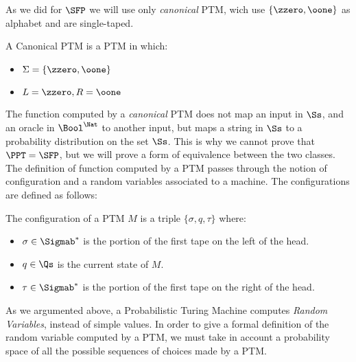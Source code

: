 As we did for $\SFP$ we will use only \emph{canonical} PTM,
wich use $\{\zzero, \oone\}$ as alphabet and are single-taped.
%

\begin{defn}
  A Canonical PTM is a PTM in which:
  \begin{itemize}
    \item $\Sigma =\{\zzero, \oone\}$
    \item $L = \zzero, R = \oone$
  \end{itemize}
\end{defn}

The function computed by a \emph{canonical} PTM does not map an input in $\Ss$,
and an oracle in $\Bool^\Nat$ to another input,
but maps a string in $\Ss$ to a probability distribution on the set $\Ss$. This is
why we cannot prove that $\PPT=\SFP$, but we will prove a form of equivalence
between the two classes.
%
The definition of function computed by a PTM passes through the
notion of configuration and a random variables associated to a machine.
%
The configurations are defined as follows:
%
\begin{defn}
The configuration of a PTM $M$ is a triple $\{\sigma, q, \tau\}$ where:
\begin{itemize}
\item $\sigma \in \Sigmab^*$ is the portion of the first tape on the left of the head.
\item $q \in \Qs$ is the current state of $M$.
\item $\tau \in \Sigmab^*$ is the portion of the first tape on the right of the head.
\end{itemize}
\end{defn}

As we argumented above, a Probabilistic Turing Machine computes
\emph{Random Variables}, instead of simple values. In order to
give a formal definition of the random variable computed by a PTM, we
must take in account a probability space of all the possible sequences
of choices made by a PTM.



